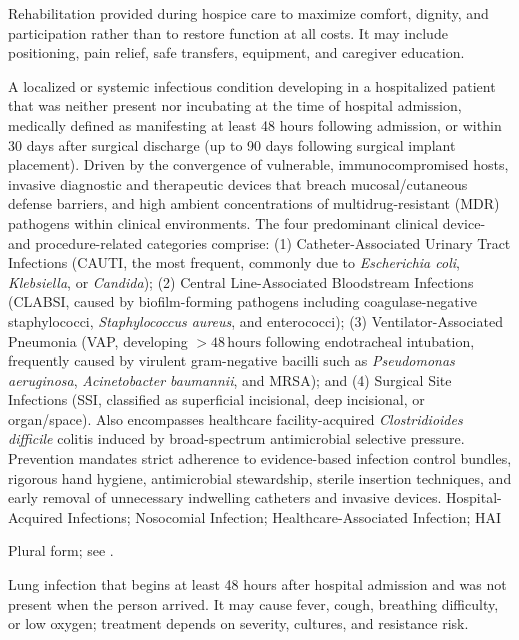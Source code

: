  Rehabilitation provided during hospice care to maximize comfort, dignity, and participation rather than to restore function at all costs. It may include positioning, pain relief, safe transfers, equipment, and caregiver education.

 A localized or systemic infectious condition developing in a hospitalized patient that was neither present nor incubating at the time of hospital admission, medically defined as manifesting at least 48 hours following admission, or within 30 days after surgical discharge (up to 90 days following surgical implant placement). Driven by the convergence of vulnerable, immunocompromised hosts, invasive diagnostic and therapeutic devices that breach mucosal/cutaneous defense barriers, and high ambient concentrations of multidrug-resistant (MDR) pathogens within clinical environments. The four predominant clinical device- and procedure-related categories comprise: (1) Catheter-Associated Urinary Tract Infections (CAUTI, the most frequent, commonly due to \textit{Escherichia coli}, \textit{Klebsiella}, or \textit{Candida}); (2) Central Line-Associated Bloodstream Infections (CLABSI, caused by biofilm-forming pathogens including coagulase-negative staphylococci, \textit{Staphylococcus aureus}, and enterococci); (3) Ventilator-Associated Pneumonia (VAP, developing $>48\,\text{hours}$ following endotracheal intubation, frequently caused by virulent gram-negative bacilli such as \textit{Pseudomonas aeruginosa}, \textit{Acinetobacter baumannii}, and MRSA); and (4) Surgical Site Infections (SSI, classified as superficial incisional, deep incisional, or organ/space). Also encompasses healthcare facility-acquired \textit{Clostridioides difficile} colitis induced by broad-spectrum antimicrobial selective pressure. Prevention mandates strict adherence to evidence-based infection control bundles, rigorous hand hygiene, antimicrobial stewardship, sterile insertion techniques, and early removal of unnecessary indwelling catheters and invasive devices.
\synonyms
Hospital-Acquired Infections; Nosocomial Infection; Healthcare-Associated Infection; HAI

 Plural form; see .

 Lung infection that begins at least 48 hours after hospital admission and was not present when the person arrived. It may cause fever, cough, breathing difficulty, or low oxygen; treatment depends on severity, cultures, and resistance risk.

